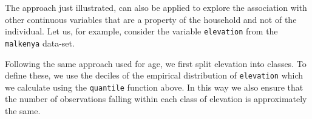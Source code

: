 \documentclass[
  letterpaper,
]{krantz}
\newenvironment{Shaded}{\begin{snugshade}}{\end{snugshade}}
\newcommand{\AttributeTok}[1]{\textcolor[rgb]{0.13,0.29,0.53}{#1}}
\newcommand{\CommentTok}[1]{\textcolor[rgb]{0.56,0.35,0.01}{\textit{#1}}}
\newcommand{\ConstantTok}[1]{\textcolor[rgb]{0.56,0.35,0.01}{#1}}
\newcommand{\ControlFlowTok}[1]{\textcolor[rgb]{0.13,0.29,0.53}{\textbf{#1}}}
\newcommand{\DecValTok}[1]{\textcolor[rgb]{0.00,0.00,0.81}{#1}}
\newcommand{\FloatTok}[1]{\textcolor[rgb]{0.00,0.00,0.81}{#1}}
\newcommand{\FunctionTok}[1]{\textcolor[rgb]{0.13,0.29,0.53}{\textbf{#1}}}
\newcommand{\NormalTok}[1]{#1}
\newcommand{\OtherTok}[1]{\textcolor[rgb]{0.56,0.35,0.01}{#1}}
\newcommand{\SpecialCharTok}[1]{\textcolor[rgb]{0.81,0.36,0.00}{\textbf{#1}}}
\begin{document}
The approach just illustrated, can also be applied to explore the
association with other continuous variables that are a property of the
household and not of the individual. Let us, for example, consider the
variable \texttt{elevation} from the \texttt{malkenya} data-set.

\begin{Shaded}
\end{Shaded}

Following the same approach used for age, we first split elevation into
classes. To define these, we use the deciles of the empirical
distribution of \texttt{elevation} which we calculate using the
\texttt{quantile} function above. In this way we also ensure that the
number of observations falling within each class of elevation is
approximately the same.

\begin{Shaded}
\end{Shaded}
\end{document}

